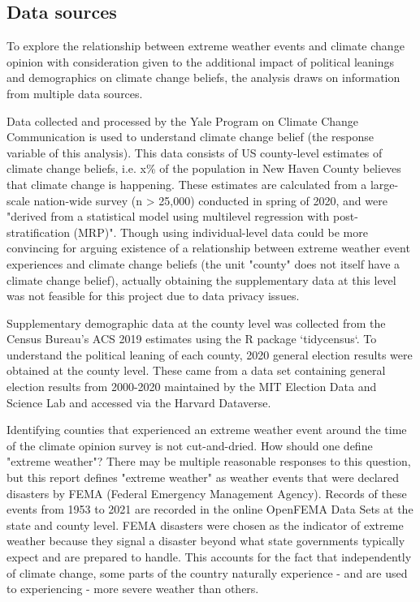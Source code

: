 \documentclass{article}
\begin{document}
\subsection{Data sources}
To explore the relationship between extreme weather events and climate
change opinion with consideration given to the additional impact of
political leanings and demographics on climate change beliefs, the analysis
draws on information from multiple data sources. 

Data collected and processed by the Yale Program on Climate Change
Communication is used to understand climate change belief (the response
variable of this analysis). This data consists of US
county-level estimates of climate change beliefs, i.e. x\% of the population
in New Haven County believes that climate change is happening. These
estimates are calculated from a large-scale nation-wide survey (n > 25,000)
conducted in spring of 2020, and were "derived from a statistical model using
multilevel regression with post-stratification (MRP)". Though using
individual-level data could be more convincing for arguing existence of a
relationship between extreme weather event experiences and climate change
beliefs (the unit "county" does not itself have a climate change belief),
actually obtaining the supplementary data at this level was not feasible for
this project due to data privacy issues. 

Supplementary demographic data at the county level was collected from the Census
Bureau's ACS 2019 estimates using the R package `tidycensus`. To understand
the political leaning of each county, 2020 general election results were obtained
at the county level. These came from a data set containing general election
results from 2000-2020 maintained by the MIT Election Data and Science Lab
and accessed via the Harvard Dataverse. 

Identifying counties that experienced an extreme weather event around the
time of the climate opinion survey is not cut-and-dried. How should one
define "extreme weather"? There may be multiple reasonable responses
to this question, but this report defines "extreme weather" as
weather events that were declared disasters by FEMA
(Federal Emergency Management Agency). Records of these events from 1953 to
2021 are recorded in the online OpenFEMA Data Sets at the state and county level.
FEMA disasters were chosen as the indicator of extreme weather because
they signal a disaster beyond what state governments typically expect and are
prepared to handle. This accounts for the fact that independently of climate
change, some parts of the country naturally experience - and are used to
experiencing - more severe weather than others.
\end{document}
